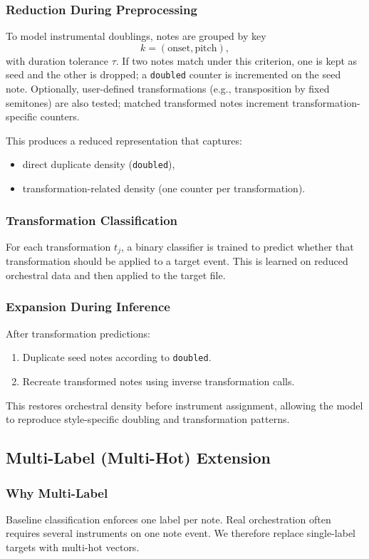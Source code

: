 \documentclass{aimc2026}
\begin{document}
\subsubsection{Reduction During Preprocessing}
To model instrumental doublings, notes are grouped by key
\[
k=(\mbox{onset}, \mbox{pitch}),
\]
with duration tolerance \(\tau\). If two notes match under this criterion, one is kept as seed and the other is dropped; a \texttt{doubled} counter is incremented on the seed note. Optionally, user-defined transformations (e.g., transposition by fixed semitones) are also tested; matched transformed notes increment transformation-specific counters.

This produces a reduced representation that captures:
\begin{itemize}
	\item direct duplicate density (\texttt{doubled}),
	\item transformation-related density (one counter per transformation).
\end{itemize}

\subsubsection{Transformation Classification}
For each transformation \(t_j\), a binary classifier is trained to predict whether that transformation should be applied to a target event. This is learned on reduced orchestral data and then applied to the target file.

\subsubsection{Expansion During Inference}
After transformation predictions:
\begin{enumerate}
	\item Duplicate seed notes according to \texttt{doubled}.
	\item Recreate transformed notes using inverse transformation calls.
\end{enumerate}
This restores orchestral density before instrument assignment, allowing the model to reproduce style-specific doubling and transformation patterns.

\subsection{Multi-Label (Multi-Hot) Extension}

\subsubsection{Why Multi-Label}
Baseline classification enforces one label per note. Real orchestration often requires several instruments on one note event. We therefore replace single-label targets with multi-hot vectors.
\end{document}
